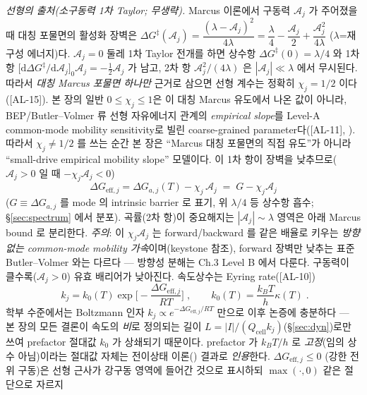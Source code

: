 \documentclass[11pt,a4paper]{article}
\newcommand{\dd}{\mathrm{d}}
\newcommand{\eff}{\mathrm{eff}}
\newcommand{\cell}{\mathrm{cell}}
\newcommand{\AL}[1]{\textsf{[AL-#1]}}
\begin{document}
\emph{선형의 출처(소구동력 1차 Taylor; 무생략).} Marcus 이론에서 구동력 $\mathcal A_j$ 가 주어졌을 때
대칭 포물면의 활성화 장벽은
$\Delta G^\ddagger(\mathcal A_j)=\dfrac{(\lambda-\mathcal A_j)^2}{4\lambda}
=\dfrac{\lambda}{4}-\dfrac{\mathcal A_j}{2}+\dfrac{\mathcal A_j^2}{4\lambda}$ ($\lambda$=재구성 에너지)다.
$\mathcal A_j=0$ 둘레 1차 Taylor 전개를 하면 상수항 $\Delta G^\ddagger(0)=\lambda/4$ 와 1차 항
$\big[\dd\Delta G^\ddagger/\dd\mathcal A_j\big]_{0}\mathcal A_j=-\tfrac12\mathcal A_j$ 가 남고, 2차 항
$\mathcal A_j^2/(4\lambda)$ 은 $|\mathcal A_j|\ll\lambda$ 에서 무시된다. 따라서 \emph{대칭 Marcus 포물면 하나만}
근거로 삼으면 선형 계수는 정확히 $\chi_j=1/2$ 이다(\AL{15}). 본 장의 일반 $0\le\chi_j\le1$은 이
대칭 Marcus 유도에서 나온 값이 아니라, BEP/Butler--Volmer 류 선형 자유에너지 관계의 \emph{empirical slope}를
Level-A common-mode mobility sensitivity로 빌린 coarse-grained parameter다(\AL{11}, \cite{evanspolanyi1938,bardfaulkner}).
따라서 $\chi_j\ne1/2$ 를 쓰는 순간 본 장은 ``Marcus 대칭 포물면의 직접 유도''가 아니라 ``small-drive empirical
mobility slope'' 모델이다. 이 1차 항이 장벽을 낮추므로($\mathcal A_j>0$ 일 때 $-\chi_j\mathcal A_j<0$)
\begin{equation}
\boxed{\;\Delta G_{\eff,j}=\Delta G_{a,j}(T)-\chi_j\,\mathcal A_j\;=\;G-\chi_j\mathcal A_j\;}
\label{eq:Geff}
\end{equation}
($G\equiv\Delta G_{a,j}$ 를 mode 의 intrinsic barrier 로 표기, 위 $\lambda/4$ 등 상수항 흡수;
\S\ref{sec:spectrum} 에서 분포). 곡률(2차 항)이 중요해지는 $|\mathcal A_j|\sim\lambda$ 영역은 아래 Marcus
bound 로 분리한다. \emph{주의}: 이 $\chi_j\mathcal A_j$ 는 forward/backward 를 같은 배율로 키우는
\emph{방향 없는 common-mode mobility 가속}이며(keystone 참조), forward 장벽만 낮추는 표준 Butler--Volmer
와는 다르다 — 방향성 분해는 Ch.3 Level B 에서 다룬다. 구동력이
클수록($\mathcal A_j>0$) 유효 배리어가 낮아진다. 속도상수는 Eyring rate(\AL{10})
\begin{equation}
\boxed{\;k_j=k_0(T)\exp\!\Big[-\frac{\Delta G_{\eff,j}}{RT}\Big]\;,\qquad k_0(T)=\frac{k_BT}{h}\kappa(T)\;.}
\label{eq:kact}
\end{equation}
학부 수준에서는 Boltzmann 인자 $k_j\propto e^{-\Delta G_{\eff,j}/RT}$ 만으로 이후 논증에 충분하다 — 본 장의
모든 결론이 속도의 \emph{비}로 정의되는 길이 $L=|I|/(Q_\cell k_j)$(\S\ref{sec:dyn})로만 쓰여 prefactor 절대값
$k_0$ 가 상쇄되기 때문이다. prefactor 가 $k_BT/h$ 로 \emph{고정}(임의 상수 아님)이라는 절대값 자체는 전이상태
이론(\cite{eyring1935}) 결과로 \emph{인용}한다. $\Delta G_{\eff,j}\le0$
(강한 전위 구동)은 선형 근사가 강구동 영역에 들어간 것으로 표시하되 $\max(\cdot,0)$ 같은 절단으로 자르지
\end{document}
